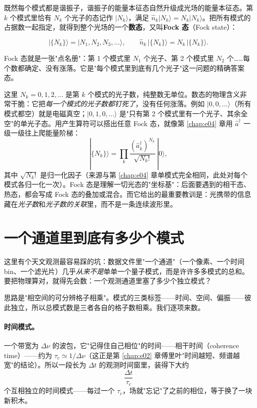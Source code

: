 既然每个模式都是谐振子，谐振子的能量本征态自然升级成光场的能量本征态。第 \(k\) 个模式里恰有 \(N_k\) 个光子的态记作 \(|N_k\rangle\)，满足 \(\hat n_k|N_k\rangle=N_k|N_k\rangle\)。把所有模式的占据数一起指定，就得到整个光场的一个\textbf{数态}，又叫\textbf{Fock 态}（Fock state）：

\begin{equation}
  |\{N_k\}\rangle=|N_1,N_2,N_3,\dots\rangle,
  \qquad
  \hat n_k\,|\{N_k\}\rangle=N_k\,|\{N_k\}\rangle .
  \label{eq:e05-fock}
\end{equation}
\begin{formulaexplain}
Fock 态就是一张"点名册"：第 1 个模式里 \(N_1\) 个光子、第 2 个模式里 \(N_2\) 个……每个数都确定、没有涨落。它是"每个模式里到底有几个光子"这一问题的精确答案态。
\end{formulaexplain}

这里 \(N_k=0,1,2,\dots\) 是第 \(k\) 个模式的光子数，纯整数无单位。数态的物理含义非常干脆：它把\emph{每一个模式的光子数都钉死了}，没有任何涨落。例如 \(|0,0,\dots\rangle\)（所有模式都空）就是电磁真空；\(|0,1,0,\dots\rangle\) 是"只有第 2 个模式里有一个光子、其余全空"的单光子态。用产生算符可以搭出任意 Fock 态，就像第 \ref{chap:e04} 章用 \(\hat a^\dagger\) 一级一级往上爬能量阶梯：
\[
  |\{N_k\}\rangle=\prod_k\frac{(\hat a_k^\dagger)^{N_k}}{\sqrt{N_k!}}\,|0\rangle,
\]
其中 \(\sqrt{N_k!}\) 是归一化因子（来源与第 \ref{chap:e04} 章单模式完全相同，此处对每个模式各归一化一次）。Fock 态是理解一切光态的"坐标基"：后面要遇到的相干态、热态，都会写成 Fock 态的叠加或混合。而它给出的最重要教训是：光携带的信息藏在\emph{光子数}和\emph{光子数的关联}里，而不是一条连续波形里。

\section{一个通道里到底有多少个模式}
\label{sec:e05-mode-count}

这里有个天文观测最容易踩的坑：数据文件里"一个通道"（一个像素、一个时间 bin、一个滤光片）几乎\emph{从来不是}单单一个量子模式，而是许许多多模式的总和。要把物理算对，就得先会数：一个观测通道里塞了多少个独立模式？

思路是"相空间的可分辨格子相乘"。模式的三类标签——时间、空间、偏振——彼此独立，所以总模式数是三者各自的格子数相乘。我们逐项来数。

\paragraph{时间模式。}一个带宽为 \(\Delta\nu\) 的波包，它"记得住自己相位"的时间——相干时间（coherence time）——约为 \(\tau_c\simeq1/\Delta\nu\)（这正是第 \ref{chap:e02} 章傅里叶"时间越短、频谱越宽"的结论）。所以一段长为 \(\Delta t\) 的观测时间窗里，装得下大约
\[
  \frac{\Delta t}{\tau_c}
\]
个互相独立的时间模式——每过一个 \(\tau_c\)，场就"忘记"了之前的相位，等于换了一块新积木。


